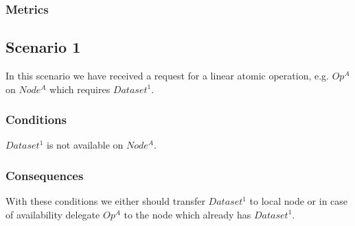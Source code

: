 \subsubsection{Metrics}


\subsection{Scenario 1}
In this scenario we have received a request for a linear atomic operation, e.g. \(Op^A\) on \(Node^A\) which
requires \( Dataset^1 \).

\subsubsection{Conditions} \( Dataset^1 \) is not available on \( Node^A \).
\subsubsection{Consequences} With these conditions we either should transfer \( Dataset^1 \)
to local node or in case of availability delegate \(Op^A\) to the node which already has \( Dataset^1 \).


